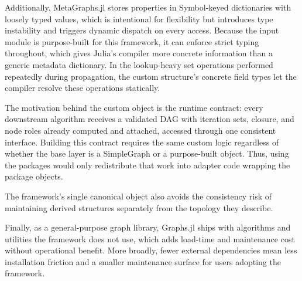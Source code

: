 \documentclass[12pt]{report}
\begin{document}
Additionally, MetaGraphs.jl stores properties in Symbol-keyed dictionaries with loosely typed values, which is intentional for flexibility but introduces type instability and triggers dynamic dispatch on every access. Because the input module is purpose-built for this framework, it can enforce strict typing throughout, which gives Julia's compiler more concrete information than a generic metadata dictionary. In the lookup-heavy set operations performed repeatedly during propagation, the custom structure's concrete field types let the compiler resolve these operations statically.

The motivation behind the custom object is the runtime contract: every downstream algorithm receives a validated DAG with iteration sets, closure, and node roles already computed and attached, accessed through one consistent interface. Building this contract requires the same custom logic regardless of whether the base layer is a SimpleGraph or a purpose-built object. Thus, using the packages would only redistribute that work into adapter code wrapping the package objects.

The framework's single canonical object also avoids the consistency risk of maintaining derived structures separately from the topology they describe.

Finally, as a general-purpose graph library, Graphs.jl ships with algorithms and utilities the framework does not use, which adds load-time and maintenance cost without operational benefit. More broadly, fewer external dependencies mean less installation friction and a smaller maintenance surface for users adopting the framework.

\ifdefined\maindoc
\else
\end{document}
